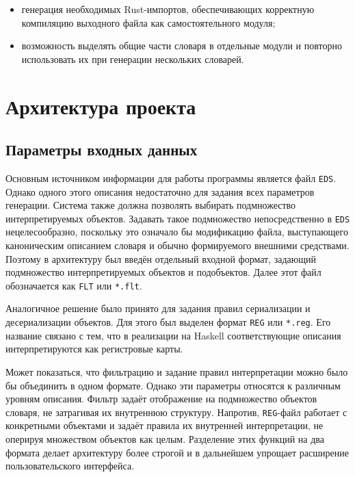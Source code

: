 \documentclass[a4paper,12pt]{article}
\begin{document}
\begin{itemize}
  \begin{itemize}
    \item реализацию trait-ов, определяемых природой объекта;
    \item реализацию преобразований, необходимых для сериализации и десериализации;
    \item реализацию trait-ов, связывающих конкретные типы объектов с интерфейсами \texttt{Value}, \texttt{Index} и \texttt{Dict};
  \end{itemize}
  \item генерация необходимых Rust-импортов, обеспечивающих корректную компиляцию выходного файла как самостоятельного модуля;
  \item возможность выделять общие части словаря в отдельные модули и повторно использовать их при генерации нескольких словарей.
\end{itemize}

\pagebreak


\section{Архитектура проекта}

\subsection{Параметры входных данных}

Основным источником информации для работы программы является файл \texttt{EDS}. Однако
одного этого описания недостаточно для задания всех параметров генерации. Система также
должна позволять выбирать подмножество интерпретируемых объектов. Задавать такое
подмножество непосредственно в \texttt{EDS} нецелесообразно, поскольку это означало бы
модификацию файла, выступающего каноническим описанием словаря и обычно формируемого внешними
средствами. Поэтому в архитектуру был введён отдельный входной формат, задающий
подмножество интерпретируемых объектов и подобъектов. Далее этот файл обозначается как
\texttt{FLT} или \texttt{*.flt}.

Аналогичное решение было принято для задания правил сериализации и десериализации
объектов. Для этого был выделен формат \texttt{REG} или \texttt{*.reg}. Его название
связано с тем, что в реализации на Haskell соответствующие описания интерпретируются как
регистровые карты.

Может показаться, что фильтрацию и задание правил интерпретации можно было бы объединить
в одном формате. Однако эти параметры относятся к различным уровням описания. Фильтр
задаёт отображение на подмножество объектов словаря, не затрагивая их внутреннюю
структуру. Напротив, \texttt{REG}-файл работает с конкретными объектами и задаёт правила
их внутренней интерпретации, не оперируя множеством объектов как целым. Разделение этих
функций на два формата делает архитектуру более строгой и в дальнейшем упрощает
расширение пользовательского интерфейса.
\end{document}
